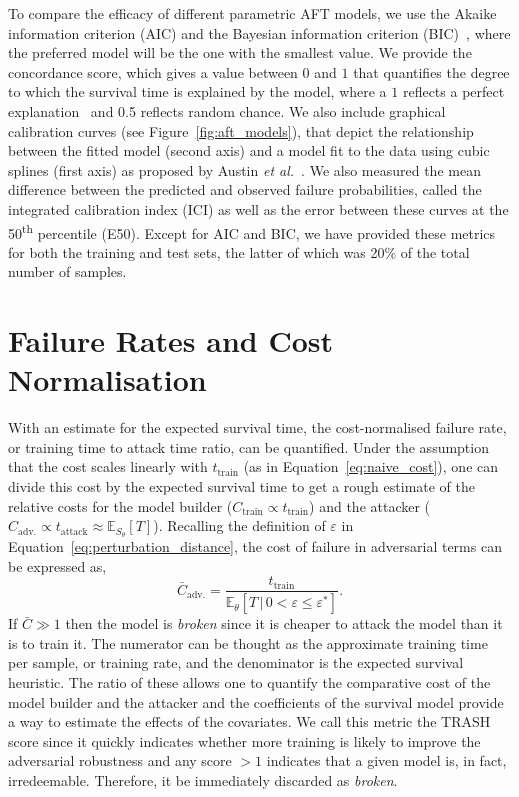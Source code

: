 To compare the efficacy of different parametric AFT models, we use the Akaike information criterion (AIC) and the Bayesian information criterion (BIC)~\cite{stoica2004model,taddy2019business}, where the preferred model will be the one with the smallest value. We provide the
concordance score, which gives a value between $0$ and $1$ that quantifies the degree to which the survival time is explained by the model, where a $1$ reflects a perfect explanation~\cite{kleinbaum1996survival} and 0.5 reflects random chance. We also include graphical calibration curves (see Figure~\ref{fig:aft_models}), that depict the relationship between the fitted model (second axis) and a model fit to the data using cubic splines (first axis) as proposed by Austin \textit{et al.}~\cite{ici}. We also measured the mean difference between the predicted and observed failure probabilities,  called the integrated calibration index (ICI) as well as the error between these curves at the 50\textsuperscript{th} percentile (E50). Except for AIC and BIC, we have provided these metrics for both the training and test sets, the latter of which was 20\% of the total number of samples.

\section{Failure Rates and Cost Normalisation}
\label{cost_normalization}

With an estimate for the expected survival time, the cost-normalised failure rate, or training time to attack time ratio, can be quantified. Under the assumption that the cost scales linearly with $t_{\mathrm{train}}$ (as in Equation~\ref{eq:naive_cost}), one can divide this cost by the expected survival time to get a rough estimate of the relative costs for the model builder ($C_{\mathrm{train}} \propto t_{\mathrm{train}}$) and the attacker ($C_{\mathrm{adv.}} \propto t_{\mathrm{attack}} \approx \mathbb{E}_{S_\theta}[T]$). Recalling the definition of $\varepsilon$ in Equation~\ref{eq:perturbation_distance}, the cost of failure in adversarial terms can be expressed as,
\begin{equation}
	\bar{C}_{\mathrm{adv.}}=\frac{t_{\mathrm{train}}}{\mathbb{E}_{\theta}[T \,|\, 0 < \varepsilon \leq \varepsilon^*]}.
	\label{eq:cost}
\end{equation}
If $\bar{C} \gg 1$  then the model is \textit{broken} since it is cheaper to attack the model than it is to train it.
The numerator can be thought as the approximate training time per sample, or training rate, and the denominator is the expected survival heuristic. 
The ratio of these allows one to quantify the comparative cost of the model builder and the attacker and the coefficients of the survival model provide a way to estimate the effects of the covariates.
We call this metric the TRASH score since it quickly indicates whether more training is likely to improve the adversarial robustness and any score $ > 1$ indicates that a given model is, in fact, irredeemable.
Therefore, it be immediately discarded as \textit{broken}. 


